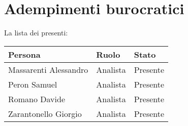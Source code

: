 \section{Adempimenti burocratici}

La lista dei presenti:

\begin{center}
    \begin{tabularx}{\linewidth}{X l l}            
        \textbf{Persona} & \textbf{Ruolo} & \textbf{Stato}\\

        \hline

        Massarenti Alessandro & Analista & Presente\\
        Peron Samuel & Analista & Presente\\
        Romano Davide & Analista & Presente\\
        Zarantonello Giorgio & Analista & Presente\\

    \end{tabularx}
\end{center}
